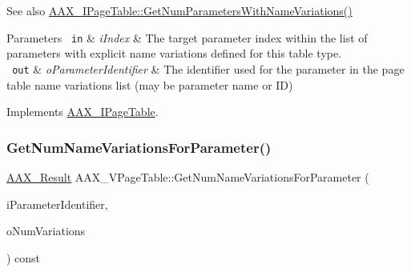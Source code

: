 \begin{DoxyItemize}
\item \begin{DoxySeeAlso}{See also}
\mbox{\hyperlink{a01849_ad186d2870ad5c188a7375080e8a7907b}{A\+A\+X\+\_\+\+I\+Page\+Table\+::\+Get\+Num\+Parameters\+With\+Name\+Variations()}}
\end{DoxySeeAlso}

\begin{DoxyParams}[1]{Parameters}
\mbox{\texttt{ in}}  & {\em i\+Index} & The target parameter index within the list of parameters with explicit name variations defined for this table type. \\
\hline
\mbox{\texttt{ out}}  & {\em o\+Parameter\+Identifier} & The identifier used for the parameter in the page table name variations list (may be parameter name or ID) \\
\hline
\end{DoxyParams}

\end{DoxyItemize}

Implements \mbox{\hyperlink{a01849_ac505024dd195c1965c54acac8f1f3016}{A\+A\+X\+\_\+\+I\+Page\+Table}}.

\mbox{\label{a01929_a07f92bc1f31bbab5156cac7ad0d35565}} 
\subsubsection{\texorpdfstring{GetNumNameVariationsForParameter()}{GetNumNameVariationsForParameter()}}
{\footnotesize\ttfamily \mbox{\hyperlink{a00392_a4d8f69a697df7f70c3a8e9b8ee130d2f}{A\+A\+X\+\_\+\+Result}} A\+A\+X\+\_\+\+V\+Page\+Table\+::\+Get\+Num\+Name\+Variations\+For\+Parameter (\begin{DoxyParamCaption}\item[{\mbox{\hyperlink{a00392_ab4e01b971dac1b25632fd9f710dd8f77}{A\+A\+X\+\_\+\+C\+Page\+Table\+Param\+ID}}}]{i\+Parameter\+Identifier,  }\item[{int32\+\_\+t \&}]{o\+Num\+Variations }\end{DoxyParamCaption}) const\hspace{0.3cm}{\ttfamily [virtual]}}





